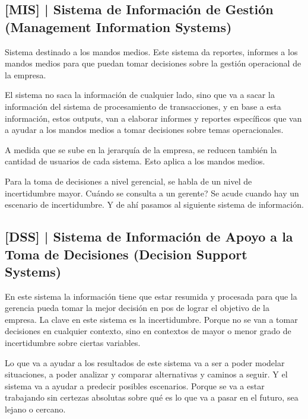 \hypertarget{sistema-de-informaciuxf3n-de-gestiuxf3n-mis}{%
\subsection{%
{[}MIS{]} |
Sistema de Información de Gestión
(Management Information Systems)
}\label{sistema-de-informaciuxf3n-de-gestiuxf3n-mis}}

Sistema destinado a los mandos medios. Este sistema da reportes,
informes a los mandos medios para que puedan tomar decisiones sobre la
gestión operacional de la empresa.

El sistema no saca la información de cualquier lado, sino que va a sacar
la información del sistema de procesamiento de transacciones, y en base
a esta información, estos outputs, van a elaborar informes y reportes
específicos que van a ayudar a los mandos medios a tomar decisiones
sobre temas operacionales.

A medida que se sube en la jerarquía de la empresa, se reducen también
la cantidad de usuarios de cada sistema. Esto aplica a los mandos
medios.

Para la toma de decisiones a nivel gerencial, se habla de un nivel de
incertidumbre mayor. Cuándo se consulta a un gerente? Se acude cuando
hay un escenario de incertidumbre. Y de ahí pasamos al siguiente sistema
de información.

\hypertarget{sistema-de-informaciuxf3n-de-apoyo-a-la-toma-de-decisiones}{%
\subsection{%
{[}DSS{]} |
Sistema de Información de Apoyo a la Toma de Decisiones
(Decision Support Systems)
}\label{sistema-de-informaciuxf3n-de-apoyo-a-la-toma-de-decisiones}}

En este sistema la información tiene que estar resumida y procesada para
que la gerencia pueda tomar la mejor decisión en pos de lograr el
objetivo de la empresa. La clave en este sistema es la incertidumbre.
Porque no se van a tomar decisiones en cualquier contexto, sino en
contextos de mayor o menor grado de incertidumbre sobre ciertas
variables.

Lo que va a ayudar a los resultados de este sistema va a ser a poder
modelar situaciones, a poder analizar y comparar alternativas y caminos
a seguir. Y el sistema va a ayudar a predecir posibles escenarios.
Porque se va a estar trabajando sin certezas absolutas sobre qué es lo
que va a pasar en el futuro, sea lejano o cercano.

